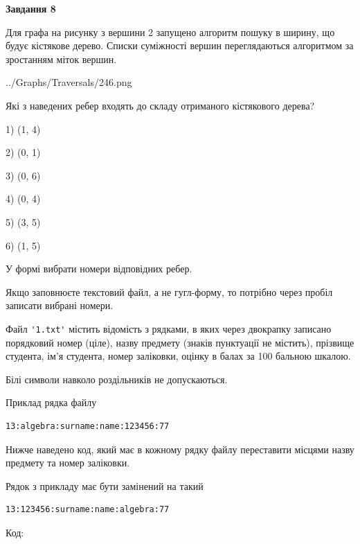\documentclass[12pt, ukrainian]{article}
\def\code#1{\Verb!#1!}
\begin{document}
{\begin {large}
{\begin {center}\textbf{Завдання 8}\end {center}}\par
Для графа на рисунку з вершини 2 запущено алгоритм пошуку в ширину, що будує кістякове дерево. Списки суміжності вершин переглядаються алгоритмом за зростанням міток вершин.\par
\begin{center}
	{../Graphs/Traversals/246.png}
\end{center}
\par Які з наведених ребер входять до складу отриманого кістякового дерева?\par
1) (1, 4)\par
2) (0, 1)\par
3) (0, 6)\par
4) (0, 4)\par
5) (3, 5)\par
6) (1, 5)\par
{\vskip 15pt} У формі вибрати номери відповідних ребер.


Якщо заповнюєте текстовий файл, а не гугл-форму, то потрібно через пробіл записа\-ти вибрані номери.\par
\newpage


Файл \code{'1.txt'} містить відомість з рядками, в яких через двокрапку записано поряд\-ковий номер (ціле), назву предмету (знаків пунктуації не містить), прізвище студента, ім'я студента, номер заліковки, оцінку в балах за 100 бальною шкалою.

Білі символи навколо роздільників не допускаються.

Приклад рядка файлу



\begin{verbatim}
13:algebra:surname:name:123456:77
\end{verbatim}


Нижче наведено код, який має в кожному рядку файлу переставити місцями назву предмету та номер заліковки.

Рядок з прикладу має бути замінений на такий



\begin{verbatim}
13:123456:surname:name:algebra:77
\end{verbatim}




Код:




\end{large}}
\end{document}
